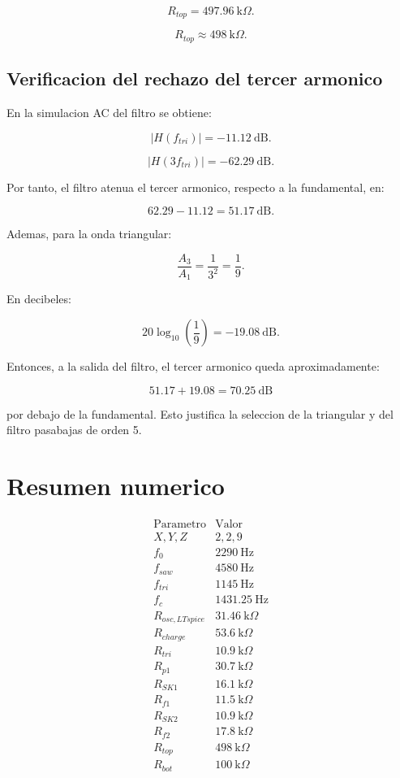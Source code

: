 \documentclass[11pt,letterpaper]{article}
\begin{document}
\[
R_{top}=497.96~\text{k}\Omega.
\]

\[
\boxed{R_{top}\approx 498~\text{k}\Omega}.
\]

\subsection{Verificacion del rechazo del tercer armonico}

En la simulacion AC del filtro se obtiene:

\[
|H(f_{tri})|=-11.12~\text{dB}.
\]

\[
|H(3f_{tri})|=-62.29~\text{dB}.
\]

Por tanto, el filtro atenua el tercer armonico, respecto a la fundamental, en:

\[
62.29-11.12=51.17~\text{dB}.
\]

Ademas, para la onda triangular:

\[
\frac{A_3}{A_1}=\frac{1}{3^2}=\frac{1}{9}.
\]

En decibeles:

\[
20\log_{10}\left(\frac{1}{9}\right)=-19.08~\text{dB}.
\]

Entonces, a la salida del filtro, el tercer armonico queda aproximadamente:

\[
51.17+19.08=70.25~\text{dB}
\]

por debajo de la fundamental. Esto justifica la seleccion de la triangular y
del filtro pasabajas de orden 5.

\section{Resumen numerico}

\[
\begin{array}{c|c}
\text{Parametro} & \text{Valor} \\
\hline
X,Y,Z & 2,2,9\\
f_0 & 2290~\text{Hz}\\
f_{saw} & 4580~\text{Hz}\\
f_{tri} & 1145~\text{Hz}\\
f_c & 1431.25~\text{Hz}\\
R_{osc,LTspice} & 31.46~\text{k}\Omega\\
R_{charge} & 53.6~\text{k}\Omega\\
R_{tri} & 10.9~\text{k}\Omega\\
R_{p1} & 30.7~\text{k}\Omega\\
R_{SK1} & 16.1~\text{k}\Omega\\
R_{f1} & 11.5~\text{k}\Omega\\
R_{SK2} & 10.9~\text{k}\Omega\\
R_{f2} & 17.8~\text{k}\Omega\\
R_{top} & 498~\text{k}\Omega\\
R_{bot} & 100~\text{k}\Omega
\end{array}
\]
\end{document}
